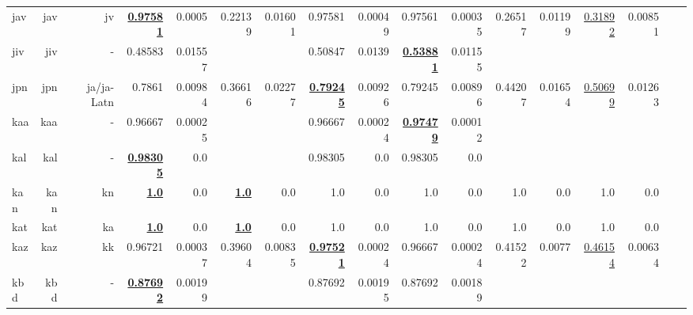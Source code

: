 \documentclass[11pt]{article}
\begin{document}
\begin{table*}[h]
{\begin{tabular}{lrrrrrrrrrrrrrrrr}
jav         & jav         & jv         & \textbf{\underline{0.97581}}         & 0.0005         & 0.22139         & 0.01601         & 0.97581         & 0.00049         & 0.97561         & 0.00035         & 0.26517         & 0.01199         & \underline{0.31892}         & 0.00851         \\
jiv         & jiv         & -         & 0.48583         & 0.01557         &          &          & 0.50847         & 0.0139         & \textbf{\underline{0.53881}}         & 0.01155         &          &          &          &          \\
jpn         & jpn         & ja/ja-Latn         & 0.7861         & 0.00984         & 0.36616         & 0.02277         & \textbf{\underline{0.79245}}         & 0.00926         & 0.79245         & 0.00896         & 0.44207         & 0.01654         & \underline{0.50699}         & 0.01263         \\
kaa         & kaa         & -         & 0.96667         & 0.00025         &          &          & 0.96667         & 0.00024         & \textbf{\underline{0.97479}}         & 0.00012         &          &          &          &          \\
kal         & kal         & -         & \textbf{\underline{0.98305}}         & 0.0         &          &          & 0.98305         & 0.0         & 0.98305         & 0.0         &          &          &          &          \\
kan         & kan         & kn         & \textbf{\underline{1.0}}         & 0.0         & \textbf{\underline{1.0}}         & 0.0         & 1.0         & 0.0         & 1.0         & 0.0         & 1.0         & 0.0         & 1.0         & 0.0         \\
kat         & kat         & ka         & \textbf{\underline{1.0}}         & 0.0         & \textbf{\underline{1.0}}         & 0.0         & 1.0         & 0.0         & 1.0         & 0.0         & 1.0         & 0.0         & 1.0         & 0.0         \\
kaz         & kaz         & kk         & 0.96721         & 0.00037         & 0.39604         & 0.00835         & \textbf{\underline{0.97521}}         & 0.00024         & 0.96667         & 0.00024         & 0.41522         & 0.0077         & \underline{0.46154}         & 0.00634         \\
kbd         & kbd         & -         & \textbf{\underline{0.87692}}         & 0.00199         &          &          & 0.87692         & 0.00195         & 0.87692         & 0.00189         &          &          &          &          \\

\end{tabular}}
\end{table*}
\end{document}
